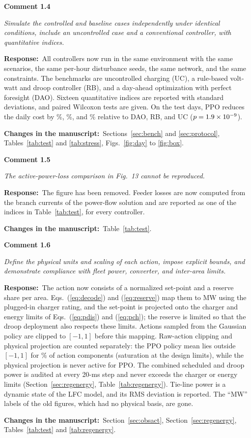 \documentclass[10pt,a4paper]{article}
\newcommand{\rc}[1]{\par\noindent\textbf{Comment #1}\par}
\newcommand{\resp}{\par\noindent\textbf{Response:}\ }
\newcommand{\chg}{\par\noindent\textbf{Changes in the manuscript:}\ }
\begin{document}
\rc{1.4} \emph{Simulate the controlled and baseline cases independently
under identical conditions, include an uncontrolled case and a
conventional controller, with quantitative indices.}
\resp All controllers now run in the same environment with the same
scenarios, the same per-hour disturbance seeds, the same network, and
the same constraints. The benchmarks are uncontrolled charging (UC), a
rule-based volt-watt and droop controller (RB), and a day-ahead
optimization with perfect foresight (DAO). Sixteen quantitative indices
are reported with standard deviations, and paired Wilcoxon tests are
given. On the test days, PPO reduces the daily cost by \TRedCostDAO\%,
\TRedCostRB\%, and \TRedCostUC\% relative to DAO, RB, and UC ($p=1.9\times10^{-9}$).
\chg Sections~\ref{sec:bench} and \ref{sec:protocol}, Tables~\ref{tab:test} and \ref{tab:stress}, Figs.~\ref{fig:day} to \ref{fig:box}.

\rc{1.5} \emph{The active-power-loss comparison in Fig.~13 cannot be
reproduced.}
\resp The figure has been removed. Feeder losses are now computed from
the branch currents of the power-flow solution and are reported as one
of the indices in Table~\ref{tab:test}, for every controller.
\chg Table~\ref{tab:test}.

\rc{1.6} \emph{Define the physical units and scaling of each action,
impose explicit bounds, and demonstrate compliance with fleet power,
converter, and inter-area limits.}
\resp The action now consists of a normalized set-point and a reserve
share per area. Eqs.~(\ref{eq:decode}) and (\ref{eq:reserve}) map them to MW using the plugged-in
charger rating, and the set-point is projected onto the charger and
energy limits of Eqs.~(\ref{eq:pdis}) and (\ref{eq:pch}); the reserve is limited so that the
droop deployment also respects these limits. Actions sampled from the
Gaussian policy are clipped to $[-1,1]$ before this mapping. Raw-action
clipping and physical projection are counted separately: the PPO policy
mean lies outside $[-1,1]$ for \RawClipFracPct\% of action components
(saturation at the design limits), while the physical projection is
never active for PPO. The combined scheduled and droop power is audited
at every 20-ms step and never exceeds the charger or energy limits
(Section~\ref{sec:regenergy}, Table~\ref{tab:regenergy}). Tie-line power is a dynamic state of the LFC
model, and its RMS deviation is reported. The ``MW'' labels
of the old figures, which had no physical basis, are gone.
\chg Section~\ref{sec:obsact}, Section~\ref{sec:regenergy}, Tables~\ref{tab:test} and \ref{tab:regenergy}.
\end{document}
